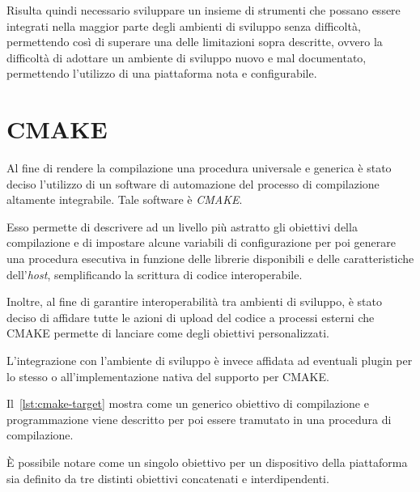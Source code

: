 Risulta quindi necessario sviluppare un insieme di strumenti che possano essere integrati nella maggior parte degli ambienti di sviluppo senza difficoltà, permettendo così di superare una delle limitazioni sopra descritte, ovvero la difficoltà di adottare un ambiente di sviluppo nuovo e mal documentato, permettendo l'utilizzo di una piattaforma nota e configurabile.

\section{CMAKE}\label{s:cmake}

Al fine di rendere la compilazione una procedura universale e generica è stato deciso l'utilizzo di un software di automazione del processo di compilazione altamente integrabile. Tale software è \textit{CMAKE}.

Esso permette di descrivere ad un livello più astratto gli obiettivi della compilazione e di impostare alcune variabili di configurazione per poi generare una procedura esecutiva in funzione delle librerie disponibili e delle caratteristiche dell'\textit{host}, semplificando la scrittura di codice interoperabile.

Inoltre, al fine di garantire interoperabilità tra ambienti di sviluppo, è stato deciso di affidare tutte le azioni di upload del codice a processi esterni che CMAKE permette di lanciare come degli obiettivi personalizzati.

L'integrazione con l'ambiente di sviluppo è invece affidata ad eventuali plugin per lo stesso o all'implementazione nativa del supporto per CMAKE.\@

Il~\cref{lst:cmake-target} mostra come un generico obiettivo di compilazione e programmazione viene descritto per poi essere tramutato in una procedura di compilazione.

È possibile notare come un singolo obiettivo per un dispositivo della piattaforma sia definito da tre distinti obiettivi concatenati e interdipendenti.

